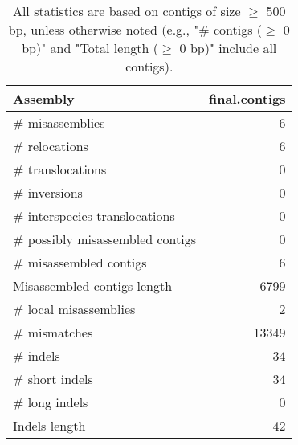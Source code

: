 \documentclass[12pt,a4paper]{article}
\begin{document}
\begin{table}[ht]
\begin{center}
\caption{All statistics are based on contigs of size $\geq$ 500 bp, unless otherwise noted (e.g., "\# contigs ($\geq$ 0 bp)" and "Total length ($\geq$ 0 bp)" include all contigs).}
\begin{tabular}{|l*{1}{|r}|}
\hline
Assembly & final.contigs \\ \hline
\# misassemblies & 6 \\ \hline
\hspace{5mm}\# relocations & 6 \\ \hline
\hspace{5mm}\# translocations & 0 \\ \hline
\hspace{5mm}\# inversions & 0 \\ \hline
\hspace{5mm}\# interspecies translocations & 0 \\ \hline
\# possibly misassembled contigs & 0 \\ \hline
\# misassembled contigs & 6 \\ \hline
Misassembled contigs length & 6799 \\ \hline
\# local misassemblies & 2 \\ \hline
\# mismatches & 13349 \\ \hline
\# indels & 34 \\ \hline
\hspace{5mm}\# short indels & 34 \\ \hline
\hspace{5mm}\# long indels & 0 \\ \hline
Indels length & 42 \\ \hline
\end{tabular}
\end{center}
\end{table}
\end{document}
